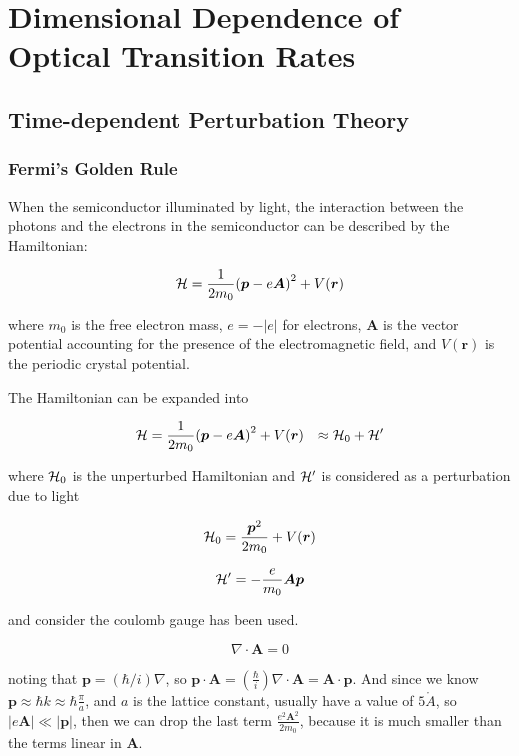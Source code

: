 \chapter{Dimensional Dependence of Optical Transition Rates} \label{RM}
 
\section{Time-dependent Perturbation Theory} \label{dust_seds}

\subsection{Fermi's Golden Rule} \label{dust_corrections}

When the semiconductor illuminated by light, the interaction between the photons and the electrons in the semiconductor can be described by the Hamiltonian:

\begin{equation}
  \mathcal{H} = \frac{1}{2m_0}{(\bm{p}-e\bm{A})}^2+V(\bm{r})
\end{equation}

where $m_0$ is the free electron mass, $e=-|e|$ for electrons, $\bm{A}$ is the vector potential accounting for the presence of the electromagnetic field, and $V(\bm{r})$ is the periodic crystal potential.

The Hamiltonian can be expanded into


\begin{eqnarray}
  & \mathcal{H} = \frac{1}{2m_0}{(\bm{p}-e\bm{A})}^2+V(\bm{r})
  &  \approx \mathcal{H}_0+\mathcal{H}^\prime
\end{eqnarray}

where $\mathcal{H}_0$ is the unperturbed Hamiltonian and ${\mathcal{H}}^\prime$ is considered as a perturbation due to light

\begin{equation}
\mathcal{H}_0=\frac{{\bm{p}}^2}{2m_0}+V(\bm{r})
\end{equation}

\begin{equation}
  \mathcal{H}^\prime=-\frac{e}{m_0}\bm{A}\bm{p}
\end{equation}

and consider the coulomb gauge has been used.

\begin{equation}
  \nabla\cdot\bm{A}=0
\end{equation}

noting that $\bm{p}=(\hbar/i)\nabla$, so $\bm{p}\cdot\bm{A}=(\frac{\hbar}{i})\nabla\cdot\bm{A}=\bm{A}\cdot\bm{p}$. And since we know $\bm{p}\approx\hbar{k}\approx\hbar\frac{\pi}{a}$, and $a$ is the lattice constant, usually have a value of $5\mathring{A}$, so $|e\bm{A}|\ll|\bm{p}|$, then we can drop the last term $\frac{e^2{\bm{A}}^2}{2m_0}$, because it is much smaller than the terms linear in $\bm{A}$.

